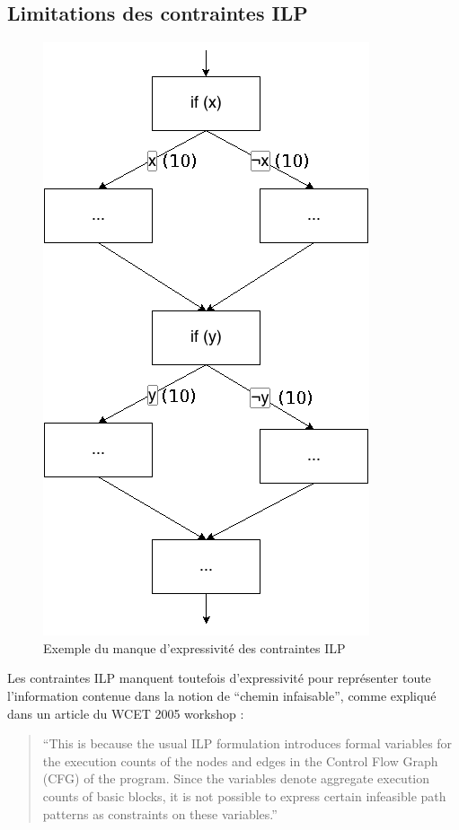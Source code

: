 \documentclass[french]{article}
\begin{document}
  \subsection{Limitations des contraintes ILP}
  \begin{figure}
    \centering
    \includegraphics[scale=0.4]{./pictures/ambiguite_ilp.png}
    \caption{Exemple du manque d'expressivité des contraintes ILP}
    \label{ambiguite ilp}
  \end{figure}

  Les contraintes ILP manquent toutefois d'expressivité pour représenter toute l'information contenue dans la notion de ``chemin infaisable'', comme expliqué dans un article du WCET 2005 workshop :

  \begin{quote}
    ``This is because the usual ILP formulation introduces formal variables for the execution counts of the nodes and edges in the Control Flow Graph (CFG) of the program. Since the variables denote aggregate execution counts of basic blocks, it is not possible to express certain infeasible path patterns as constraints on these variables.''~\cite{wcet05}
  \end{quote}
\end{document}
